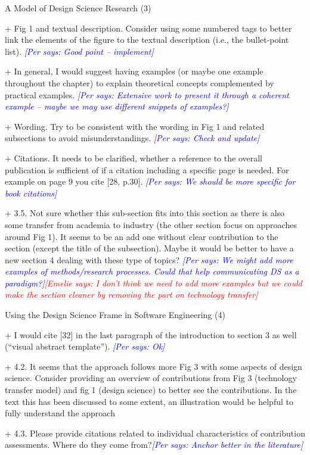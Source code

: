 \documentclass{article}
\newcommand{\emelie}[1]{\textcolor{red}{{\it [Emelie says: #1]}}}
\newcommand{\per}[1]{\textcolor{blue}
        	{{\it [Per says: #1]}}}
\newcommand{\emelie}[1]{}
\newcommand{\per}[1]{}
\begin{document}
A Model of Design Science Research (3)

+ Fig 1 and textual description. Consider using some numbered tags to better link the elements of the figure to the textual description (i.e., the bullet-point list). \per{Good point -- implement}

+ In general, I would suggest having examples (or maybe one example throughout the chapter) to explain theoretical concepts complemented by practical examples. \per{Extensive work to present it through a coherent example -- maybe we may use different snippets of examples?}

+ Wording. Try to be consistent with the wording in Fig 1 and related subsections to avoid misunderstandings. \per{Check and update}

+ Citations. It needs to be clarified, whether a reference to the overall publication is sufficient of if a citation including a specific page is needed. For example on page 9 you cite [28, p.30]. \per{We should be more specific for book citations}

+ 3.5. Not sure whether this sub-section fits into this section as there is also some transfer from academia to industry (the other section focus on approaches around Fig 1). It seems to be an add one without clear contribution to the section (except the title of the subsection). Maybe it would be better to have a new section 4 dealing with these type of topics? \per{We might add more examples of methods/research processes. Could that help communicating DS as a paradigm?}\emelie{I don't think we need to add more examples but we could make the section cleaner by removing the part on technology transfer}


Using the Design Science Frame in Software Engineering (4)

+ I would cite [32] in the last paragraph of the introduction to section 3 as well (“visual abstract template”). \per{Ok}

+ 4.2. It seems that the approach follows more Fig 3 with some aspects of design science. Consider providing an overview of contributions from Fig 3 (technology transfer model) and fig 1 (design science) to better see the contributions. In the text this has been discussed to some extent, an illustration would be helpful to fully understand the approach

+ 4.3. Please provide citations related to individual characteristics of contribution assessments. Where do they come from?\per{Anchor better in the literature}
\end{document}

